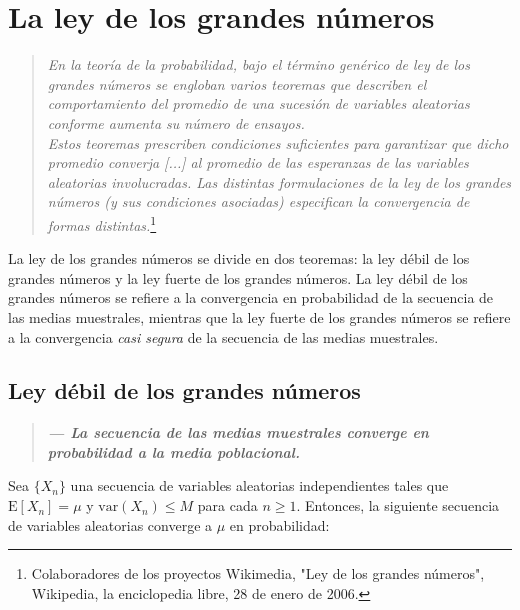\documentclass[8pt]{article}
\begin{document}
\pagebreak



\section{La ley de los grandes números}

\begin{quote}
    \textit{En la teoría de la probabilidad, bajo el término genérico de ley de los grandes números se engloban varios teoremas que describen el comportamiento del promedio de una sucesión de variables aleatorias conforme aumenta su número de ensayos. \vspace*{0.15cm} \\ Estos teoremas prescriben condiciones suficientes para garantizar que dicho promedio converja [...] al promedio de las esperanzas de las variables aleatorias involucradas. Las distintas formulaciones de la ley de los grandes números (y sus condiciones asociadas) especifican la convergencia de formas distintas.}\footnote{Colaboradores de los proyectos Wikimedia, "Ley de los grandes números", Wikipedia, la enciclopedia libre, 28 de enero de 2006.}
\end{quote}

La ley de los grandes números se divide en dos teoremas: la ley débil de los grandes números y la ley fuerte de los grandes números. La ley débil de los grandes números se refiere a la convergencia en probabilidad de la secuencia de las medias muestrales, mientras que la ley fuerte de los grandes números se refiere a la convergencia \textit{casi segura} de la secuencia de las medias muestrales.


\subsection{Ley débil de los grandes números}

\begin{quote}
    \textbf{\textit{--- La secuencia de las medias muestrales converge en probabilidad a la media poblacional.}}
\end{quote}

Sea $\{X_n\}$ una secuencia de variables aleatorias independientes tales que $\text{E}[X_n] = \mu$ y $\text{var}(X_n) \leq M$ para cada $n \geq 1$. Entonces, la siguiente secuencia de variables aleatorias converge a $\mu$ en probabilidad:
\end{document}
